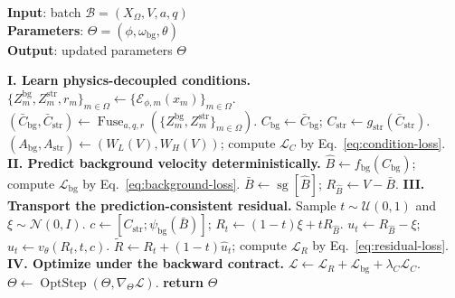 \begin{algorithm}[!b]
	\caption{Training procedure for PD-BG-RFM under the backward contract}
	\label{alg:pdbg-rfm}
	\textbf{Input}: batch $\mathcal B=(X_\Omega,V,a,q)$\\
	\textbf{Parameters}: $\Theta=(\phi,\omega_{\mathrm{bg}},\theta)$\\
	\textbf{Output}: updated parameters $\Theta$
	\begin{algorithmic}[1]
		\STATE \textbf{I. Learn physics-decoupled conditions.}
		\STATE $\{Z_m^{\mathrm{bg}},Z_m^{\mathrm{str}},r_m\}_{m\in\Omega}\gets\{\mathcal E_{\phi,m}(x_m)\}_{m\in\Omega}$.
		\STATE $(\bar C_{\mathrm{bg}},\bar C_{\mathrm{str}})\gets\operatorname{Fuse}_{a,q,r}(\{Z_m^{\mathrm{bg}},Z_m^{\mathrm{str}}\}_{m\in\Omega})$.
		\STATE $C_{\mathrm{bg}}\gets\bar C_{\mathrm{bg}}$; $C_{\mathrm{str}}\gets g_{\mathrm{str}}(\bar C_{\mathrm{str}})$.
		\STATE $(A_{\mathrm{bg}},A_{\mathrm{str}})\gets(W_L(V),W_H(V))$; compute $\mathcal L_C$ by Eq.~\ref{eq:condition-loss}.
		\STATE \textbf{II. Predict background velocity deterministically.}
		\STATE $\hat B\gets f_{\mathrm{bg}}(C_{\mathrm{bg}})$; compute $\mathcal L_{\mathrm{bg}}$ by Eq.~\ref{eq:background-loss}.
		\STATE $\bar B\gets\operatorname{sg}[\hat B]$; $R_{\hat B}\gets V-\bar B$.
		\STATE \textbf{III. Transport the prediction-consistent residual.}
		\STATE Sample $t\sim\mathcal U(0,1)$ and $\xi\sim\mathcal N(0,I)$.
		\STATE $c\gets[C_{\mathrm{str}};\psi_{\mathrm{bg}}(\bar B)]$; $R_t\gets(1-t)\xi+tR_{\hat B}$.
		\STATE $u_t\gets R_{\hat B}-\xi$; $\widehat u_t\gets v_\theta(R_t,t,c)$.
		\STATE $\widetilde R\gets R_t+(1-t)\widehat u_t$; compute $\mathcal L_R$ by Eq.~\ref{eq:residual-loss}.
		\STATE \textbf{IV. Optimize under the backward contract.}
		\STATE $\mathcal L\gets\mathcal L_R+\mathcal L_{\mathrm{bg}}+\lambda_C\mathcal L_C$.
		\STATE $\Theta\gets\operatorname{OptStep}(\Theta,\nabla_\Theta\mathcal L)$.
		\STATE \textbf{return} $\Theta$
	\end{algorithmic}
\end{algorithm}



